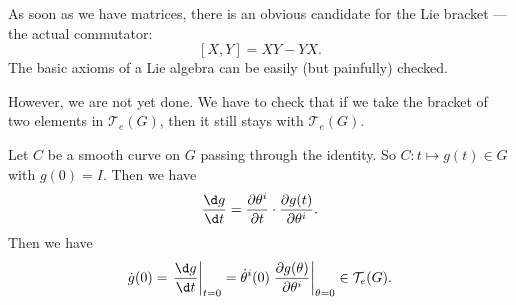 \documentclass[a4paper]{article}
\begin{document}
As soon as we have matrices, there is an obvious candidate for the Lie bracket --- the actual commutator:
\[
  [X, Y] = XY - YX.
\]
The basic axioms of a Lie algebra can be easily (but painfully) checked.

However, we are not yet done. We have to check that if we take the bracket of two elements in $\mathcal{T}_e(G)$, then it still stays with $\mathcal{T}_e(G)$.

Let $C$ be a smooth curve on $G$ passing through the identity. So $C: t \mapsto g(t) \in G$ with $g(0) = I$. Then we have
\[
  \frac{\d g}{\d t} = \frac{\partial \theta^i}{\partial t} \cdot \frac{\partial g(t)}{\partial \theta^i}.
\]
Then we have
\[
  \dot{g}(0) = \left.\frac{\d g}{\d t}\right|_{t = 0} = \dot{\theta}^i(0) \left.\frac{\partial g(\theta)}{\partial \theta^i}\right|_{\theta = 0} \in \mathcal{T}_e (G).
\]
\end{document}
